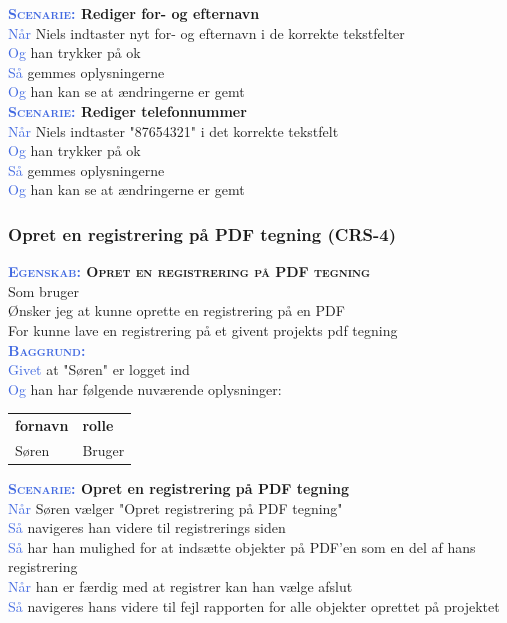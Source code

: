 \textbf{\textsc{\textcolor{RoyalBlue}{Scenarie:}} Rediger for- og efternavn}\\
\textcolor{RoyalBlue}{Når} Niels indtaster nyt for- og efternavn i de korrekte tekstfelter\\
\textcolor{RoyalBlue}{Og} han trykker på ok\\
\textcolor{RoyalBlue}{Så} gemmes oplysningerne\\
\textcolor{RoyalBlue}{Og} han kan se at ændringerne er gemt \\

\textbf{\textsc{\textcolor{RoyalBlue}{Scenarie:}} Rediger telefonnummer}\\
\textcolor{RoyalBlue}{Når} Niels indtaster "87654321" i det korrekte tekstfelt\\
\textcolor{RoyalBlue}{Og} han trykker på ok\\
\textcolor{RoyalBlue}{Så} gemmes oplysningerne\\
\textcolor{RoyalBlue}{Og} han kan se at ændringerne er gemt \\

\subsubsection{Opret en registrering på PDF tegning (CRS-4)} \label{sec:USOpretRegPåPDF}
\textbf{\textsc{\textcolor{RoyalBlue}{Egenskab:} Opret en registrering på PDF tegning}}\\
Som bruger\\
Ønsker jeg at kunne oprette en registrering på en PDF\\
For kunne lave en registrering på et givent projekts pdf tegning \\

\textsc{\textcolor{RoyalBlue}{\textbf{Baggrund:}}}\\
\textcolor{RoyalBlue}{Givet} at "Søren" er logget ind\\
\textcolor{RoyalBlue}{Og} han har følgende nuværende oplysninger:\\
\begin{tabular}{| l | l |}
	\textbf{fornavn} & \textbf{rolle} \\
	Søren & Bruger\\
\end{tabular}

\textbf{\textsc{\textcolor{RoyalBlue}{Scenarie:}} Opret en registrering på PDF tegning}\\
\textcolor{RoyalBlue}{Når} Søren vælger "Opret registrering på PDF tegning"\\
\textcolor{RoyalBlue}{Så}  navigeres han videre til registrerings siden\\
\textcolor{RoyalBlue}{Så}  har han mulighed for at indsætte objekter på PDF'en som en del af hans registrering\\
\textcolor{RoyalBlue}{Når} han er færdig med at registrer kan han vælge afslut \\
\textcolor{RoyalBlue}{Så}  navigeres hans videre til fejl rapporten for alle objekter oprettet på projektet \\

